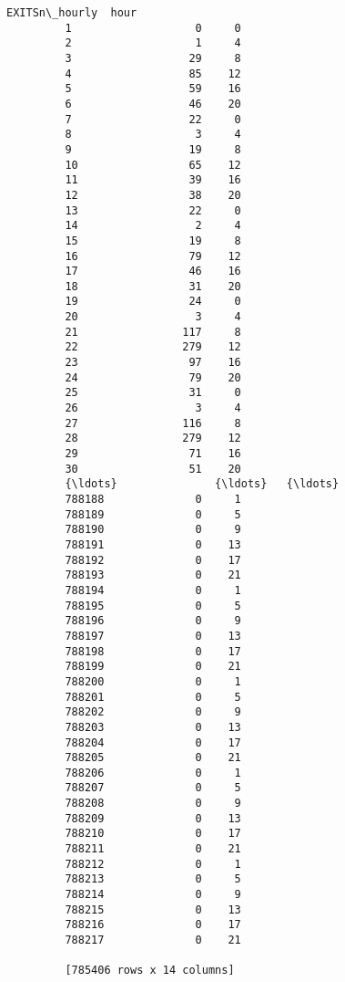 \documentclass[11pt]{article}
\begin{document}
\begin{Verbatim}[commandchars=\\\{\}]
                 EXITSn\_hourly  hour  
         1                   0     0  
         2                   1     4  
         3                  29     8  
         4                  85    12  
         5                  59    16  
         6                  46    20  
         7                  22     0  
         8                   3     4  
         9                  19     8  
         10                 65    12  
         11                 39    16  
         12                 38    20  
         13                 22     0  
         14                  2     4  
         15                 19     8  
         16                 79    12  
         17                 46    16  
         18                 31    20  
         19                 24     0  
         20                  3     4  
         21                117     8  
         22                279    12  
         23                 97    16  
         24                 79    20  
         25                 31     0  
         26                  3     4  
         27                116     8  
         28                279    12  
         29                 71    16  
         30                 51    20  
         {\ldots}               {\ldots}   {\ldots}  
         788188              0     1  
         788189              0     5  
         788190              0     9  
         788191              0    13  
         788192              0    17  
         788193              0    21  
         788194              0     1  
         788195              0     5  
         788196              0     9  
         788197              0    13  
         788198              0    17  
         788199              0    21  
         788200              0     1  
         788201              0     5  
         788202              0     9  
         788203              0    13  
         788204              0    17  
         788205              0    21  
         788206              0     1  
         788207              0     5  
         788208              0     9  
         788209              0    13  
         788210              0    17  
         788211              0    21  
         788212              0     1  
         788213              0     5  
         788214              0     9  
         788215              0    13  
         788216              0    17  
         788217              0    21  
         
         [785406 rows x 14 columns]
\end{Verbatim}
            
\end{document}
